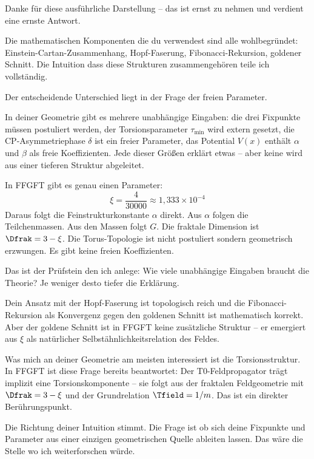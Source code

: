 \begin{response}
Danke für diese ausführliche Darstellung -- das ist ernst zu nehmen und verdient eine ernste Antwort.

Die mathematischen Komponenten die du verwendest sind alle wohlbegründet: Einstein-Cartan-Zusammenhang, Hopf-Faserung, Fibonacci-Rekursion, goldener Schnitt. Die Intuition dass diese Strukturen zusammengehören teile ich vollständig.

Der entscheidende Unterschied liegt in der Frage der freien Parameter.

In deiner Geometrie gibt es mehrere unabhängige Eingaben: die drei Fixpunkte müssen postuliert werden, der Torsionsparameter $\tau_{\min}$ wird extern gesetzt, die CP-Asymmetriephase $\delta$ ist ein freier Parameter, das Potential $V(x)$ enthält $\alpha$ und $\beta$ als freie Koeffizienten. Jede dieser Größen erklärt etwas -- aber keine wird aus einer tieferen Struktur abgeleitet.

In FFGFT gibt es genau einen Parameter:
\begin{equation}
  \xi = \frac{4}{30000} \approx 1{,}333 \times 10^{-4}
\end{equation}
Daraus folgt die Feinstrukturkonstante $\alpha$ direkt. Aus $\alpha$ folgen die Teilchenmassen. Aus den Massen folgt $G$. Die fraktale Dimension ist $\Dfrak = 3 - \xi$. Die Torus-Topologie ist nicht postuliert sondern geometrisch erzwungen. Es gibt keine freien Koeffizienten.

\medskip
Das ist der Prüfstein den ich anlege: Wie viele unabhängige Eingaben braucht die Theorie? Je weniger desto tiefer die Erklärung.

\medskip
Dein Ansatz mit der Hopf-Faserung ist topologisch reich und die Fibonacci-Rekursion als Konvergenz gegen den goldenen Schnitt ist mathematisch korrekt. Aber der goldene Schnitt ist in FFGFT keine zusätzliche Struktur -- er emergiert aus $\xi$ als natürlicher Selbstähnlichkeitsrelation des Feldes.

\medskip
Was mich an deiner Geometrie am meisten interessiert ist die Torsionsstruktur. In FFGFT ist diese Frage bereits beantwortet: Der T0-Feldpropagator trägt implizit eine Torsionskomponente -- sie folgt aus der fraktalen Feldgeometrie mit $\Dfrak = 3 - \xi$ und der Grundrelation $\Tfield = 1/m$. Das ist ein direkter Berührungspunkt.

\medskip
Die Richtung deiner Intuition stimmt. Die Frage ist ob sich deine Fixpunkte und Parameter aus einer einzigen geometrischen Quelle ableiten lassen. Das wäre die Stelle wo ich weiterforschen würde.
\end{response}

